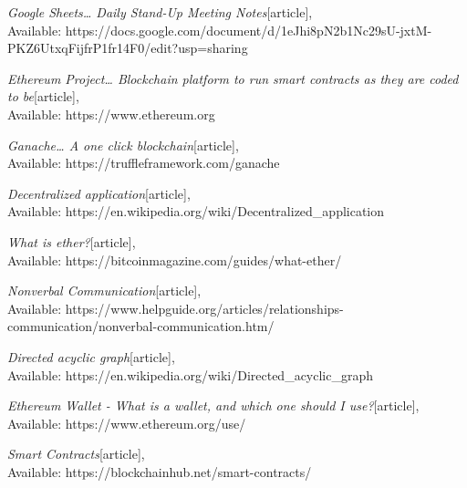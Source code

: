 \begin{thebibliography}{}
\emph{Google Sheets… Daily Stand-Up Meeting Notes}[article],\\
Available: {https://docs.google.com/document/d/1eJhi8pN2b1Nc29sU-jxtM-PKZ6UtxqFijfrP1fr14F0/edit?usp=sharing}

\emph{Ethereum Project… Blockchain platform to run smart contracts as they are coded to be}[article],\\
Available: {https://www.ethereum.org}

\emph{Ganache… A one click blockchain}[article],\\
Available: {https://truffleframework.com/ganache}

\emph{Decentralized application}[article],\\
Available: {https://en.wikipedia.org/wiki/Decentralized\_application}

\emph{What is ether?}[article],\\
Available: {https://bitcoinmagazine.com/guides/what-ether/}

\emph{Nonverbal Communication}[article],\\
Available: {https://www.helpguide.org/articles/relationships-communication/nonverbal-communication.htm/}

\emph{Directed acyclic graph}[article],\\
Available: {https://en.wikipedia.org/wiki/Directed\_acyclic\_graph}

\emph{Ethereum Wallet - What is a wallet, and which one should I use?}[article],\\
Available: {https://www.ethereum.org/use/}

\emph{Smart Contracts}[article],\\
Available: {https://blockchainhub.net/smart-contracts/}



\end{thebibliography}


